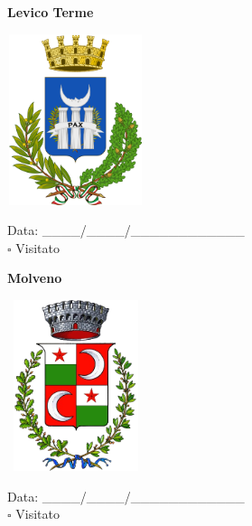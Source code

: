 \documentclass[a5paper,12pt]{article}
\begin{document}
\newpage

\noindent
\begin{minipage}[t]{0.45\textwidth}
    \begin{center}
        \textbf{Levico Terme}
    \end{center}
    \vspace{-0.5cm} %
    \begin{center}
        \includegraphics[height= 5cm, width=4cm]{Trentino Alto Adige/Stemma Levico Terme.png}
    \end{center}
    \vspace{-0.4cm} %
    \begin{flushleft}
        Data: \_\_\_\_/\_\_\_\_/\_\_\_\_\_\_\_\_\_\_\_\_ \\
        $\square$ Visitato
    \end{flushleft}
\end{minipage}
\hfill
\noindent
\begin{minipage}[t]{0.45\textwidth}
    \begin{center}
        \textbf{Molveno}
    \end{center}
    \vspace{-0.5cm} %
    \begin{center}
        \includegraphics[height= 5cm, width=4cm]{Trentino Alto Adige/Stemma Molveno.png}
    \end{center}
    \vspace{-0.4cm} %
    \begin{flushleft}
        Data: \_\_\_\_/\_\_\_\_/\_\_\_\_\_\_\_\_\_\_\_\_ \\
        $\square$ Visitato
    \end{flushleft}
\end{minipage}
\hfill
\end{document}

